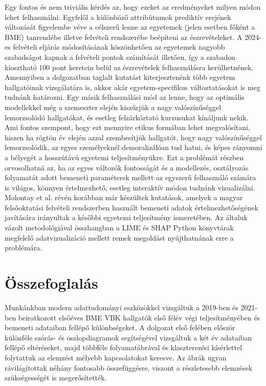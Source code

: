 \documentclass[12pt]{article}
\begin{document}
Egy fontos és nem triviális kérdés az, hogy ezeket az eredményeket milyen módon lehet felhasználni. Egyfelől a különböző attribútumok prediktív erejének változását figyelembe véve a célszerű lenne az egyetemek (jelen esetben főként a BME) tanrendébe illetve felvételi rendszerébe beépíteni az észrevételeket. A 2024-es felvételi eljárás módosításának köszönhetően az egyetemek nagyobb szabadságot kapnak a felvételi pontok számítását illetően, így a szabadon kiosztható 100 pont keretein belül az észrevételek felhasználásra kerülhetnének. Amennyiben a dolgozatban taglalt kutatást kiterjesztenénk több egyetem hallgatóinak vizsgálatára is, akkor akár egyetem-specifikus változtatásokat is meg tudnánk határozni. Egy másik felhasználási mód az lenne, hogy az optimális modellekkel még a szemeszter elején kiszűrjük a nagy valószínűséggel lemorzsolódó hallgatókat, és esetleg felzárkóztató kurzusukat kínáljunk nekik. Ami fontos szempont, hogy ezt mennyire etikus formában lehet megvalósítani, hiszen ha rögtön év elején azzal szembesítjük hallgatót, hogy nagy valószínűséggel lemorzsolódik, az egyes személyeknél demoralizálóan tud hatni, és képes rányomni a bélyegét a hosszútávú egyetemi teljesítményükre. Ezt a problémát részben orvosolhatná az, ha az egyes változók fontosságát és a modellezés, osztályozás folyamatát adott bemeneti paraméterek mellett az egyszerű felhasználó számára is világos, könnyen értelmezhető, esetleg interaktív módon tudnánk vizualizálni. Molontay et al. \cite{molontay1, molontay2} révén korábban már készültek kutatások, amelyek a magyar felsőoktatási felvételi rendszerben használt bemeneti adatok értelmezhetőségének javítására irányultak a későbbi egyetemi teljesítmény ismeretében. Az általuk vázolt metodológiával összhangban a LIME \cite{lime} és SHAP \cite{shap} Python könyvtárak megfelelő adatvizualizáció mellett remek megoldást nyújthatnának erre a problémára. 



\section{Összefoglalás}


Munkánkban modern adattudományi eszközökkel vizsgáltuk a 2019-ben és 2021-ben beiratkozott elsőéves BME VBK hallgatók első félév végi teljesítményében és bemeneti adataiban fellépő különbségeket. A dolgozat első felében először különféle szórás- és oszlopdiagramok segítségével vizsgáltuk a két év adataiban fellépő eltéréseket, majd többféle folyamatábrával és klaszterezési kísérlettel folytattuk az elemzést mélyebb kapcsolatokat keresve. Az ábrák ugyan rávilágítottak néhány fontosabb összefüggésre, viszont a részletesebb elemzések szükségességét is megerősítették.
\end{document}
